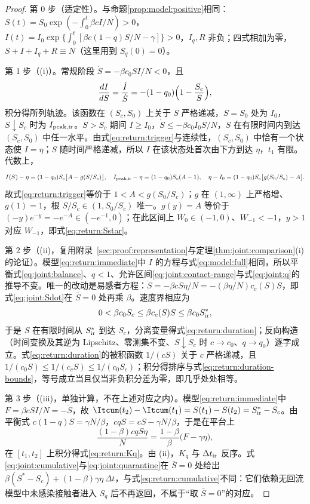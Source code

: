 \begin{proof}
第 0 步（适定性）。与命题\ref{prop:model:positive}相同：$S(t)=S_0\exp(-\int_0^t\beta cI/N)>0$，$I(t)=I_0\exp\{\int_0^t[\beta c(1-q)S/N-\gamma]\}>0$，$I_q,R$ 非负；四式相加为零，$S+I+I_q+R\equiv N$（这里用到 $S_q(0)=0$）。

第 1 步（(i)）。常规阶段 $\dot S=-\beta c_0SI/N<0$，且
\[
\frac{dI}{dS}=\frac{\dot I}{\dot S}=-(1-q_0)\Bigl(1-\frac{S_c}{S}\Bigr),
\]
积分得所列轨迹。该函数在 $(S_c,S_0)$ 上关于 $S$ 严格递减，$S=S_0$ 处为 $I_0$，$S\downarrow S_c$ 时为 $I_{\rm peak,ir}$。$S>S_c$ 期间 $I\ge I_0$，$\dot S\le-\beta c_0I_0S/N$，$S$ 在有限时间内到达 $(S_c,S_0)$ 中任一水平。由式\eqref{eq:return:trigger}与连续性，$(S_c,S_0)$ 中恰有一个状态使 $I=\eta$；$S$ 随时间严格递减，所以 $I$ 在该状态处首次由下方到达 $\eta$，$t_1$ 有限。代数上，
\[
I(S)-\eta=(1-q_0)S_c\bigl[A-g(S/S_c)\bigr],\quad
I_{\rm peak,ir}-\eta=(1-q_0)S_c(A-1),\quad
\eta-I_0=(1-q_0)S_c\bigl[g(S_0/S_c)-A\bigr].
\]
故式\eqref{eq:return:trigger}等价于 $1<A<g(S_0/S_c)$；$g$ 在 $(1,\infty)$ 上严格增、$g(1)=1$，根 $S/S_c\in(1,S_0/S_c)$ 唯一。$g(y)=A$ 等价于 $(-y)e^{-y}=-e^{-A}\in(-e^{-1},0)$；在此区间上 $W_0\in(-1,0)$、$W_{-1}<-1$\cite{Corless1996}，$y>1$ 对应 $W_{-1}$，即式\eqref{eq:return:Sstar}。

第 2 步（(ii)，复用附录~\ref{sec:proof:representation}与定理\ref{thm:joint:comparison}(i)的论证）。模型\eqref{eq:return:immediate}中 $I$ 的方程与式\eqref{eq:model:full}相同，所以平衡式\eqref{eq:joint:balance}、$q<1$、允许区间\eqref{eq:joint:contact-range}与式\eqref{eq:joint:q}的推导不变。唯一的改动是易感者方程：$\dot S=-\beta cS\eta/N=-(\beta\eta/N)c_c(S)S$，即式\eqref{eq:joint:Sdot}在 $\bar S=0$ 处再乘 $\beta$。速度界相应为
\[
0<\beta c_0S_c\le\beta c_c(S)S\le\beta c_0S^*_{\rm ir},
\]
于是 $S$ 在有限时间从 $S^*_{\rm ir}$ 到达 $S_c$，分离变量得式\eqref{eq:return:duration}；反向构造（时间变换及其逆为 Lipschitz、零测集不变、$S\downarrow S_c$ 时 $c\to c_0$、$q\to q_0$）逐字成立。式\eqref{eq:return:duration}的被积函数 $1/(cS)$ 关于 $c$ 严格递减，且 $1/(c_0S)\le1/(c_cS)\le1/(c_0S_c)$；积分得排序与式\eqref{eq:return:duration-bounds}，等号成立当且仅当非负积分差为零，即几乎处处相等。

第 3 步（(iii)，单独计算，不在上述对应之内）。模型\eqref{eq:return:immediate}中 $F=\beta cSI/N=-\dot S$，故 $\Itcum(t_2)-\Itcum(t_1)=S(t_1)-S(t_2)=S^*_{\rm ir}-S_c$。由平衡式 $c(1-q)S=\gamma N/\beta$，$cqS=cS-\gamma N/\beta$，于是在平台上
\[
\frac{(1-\beta)cqS\eta}{N}=\frac{1-\beta}{\beta}\bigl(F-\gamma\eta\bigr),
\]
在 $[t_1,t_2]$ 上积分得式\eqref{eq:return:Kq}。由 (ii)，$K_q$ 与 $\Delta t_{\rm ir}$ 反序。式\eqref{eq:joint:cumulative}与\eqref{eq:joint:quarantine}在 $\bar S=0$ 处给出 $\beta(S^*-S_c)+(1-\beta)\gamma\eta\,\Delta t$，与式\eqref{eq:return:cumulative}不同：它们依赖无回流模型中未感染接触者进入 $S_q$ 后不再返回，不属于“取 $\bar S=0$”的对应。


\end{proof}
